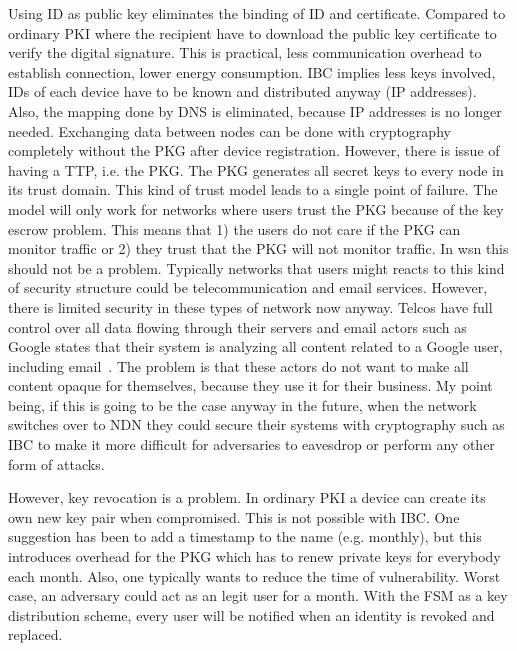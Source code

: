 Using \gls{ID} as public key eliminates the binding of ID and certificate. 
Compared to ordinary \gls{PKI} where the recipient have to download the public key certificate to verify the digital signature.
This is practical, less communication overhead to establish connection, lower energy consumption.
\gls{IBC} implies less keys involved, IDs of each device have to be known and distributed anyway (IP addresses).
Also, the mapping done by \gls{DNS} is eliminated, because IP addresses is no longer needed.
Exchanging data between nodes can be done with cryptography completely without the \gls{PKG} after device registration.
However, there is issue of having a \gls{TTP}, i.e. the \gls{PKG}.
The \gls{PKG} generates all secret keys to every node in its trust domain. 
This kind of trust model leads to a single point of failure.
The model will only work for networks where users trust the \gls{PKG} because of the key escrow problem.
This means that 1) the users do not care if the \gls{PKG} can monitor traffic or 2) they trust that the \gls{PKG} will not monitor traffic.
In \gls{wsn} this should not be a problem.
Typically networks that users might reacts to this kind of security structure could be telecommunication and email services. 
However, there is limited security in these types of network now anyway. 
Telcos have full control over all data flowing through their servers and email actors such as Google states that their system is analyzing all content related to a Google user, including email~\cite{google_reads_email}.
The problem is that these actors do not want to make all content opaque for themselves, because they use it for their business. 
My point being, if this is going to be the case anyway in the future, when the network switches over to \gls{NDN} they could secure their systems with cryptography such as \gls{IBC} to make it more difficult for adversaries to eavesdrop or perform any other form of attacks.

However, key revocation is a problem.
In ordinary \gls{PKI} a device can create its own new key pair when compromised. 
This is not possible with \gls{IBC}.
One suggestion has been to add a timestamp to the \gls{name} (e.g. monthly), but this introduces overhead for the \gls{PKG} which has to renew private keys for everybody each month. 
Also, one typically wants to reduce the time of vulnerability. 
Worst case, an adversary could act as an legit user for a month.
With the \gls{FSM} as a key distribution scheme, every user will be notified when an identity is revoked and replaced.

